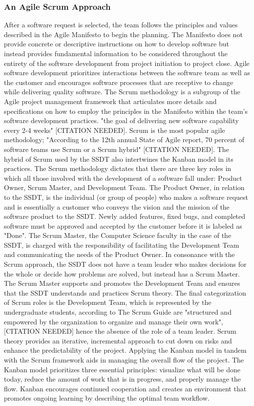 \subsubsection{An Agile Scrum Approach}
After a software request is selected, the team follows the principles and values described in the Agile Manifesto to begin the planning. The Manifesto does not provide concrete or descriptive instructions on how to develop software but instead provides fundamental information to be considered throughout the entirety of the software development from project initiation to project close. Agile software development prioritizes interactions between the software team as well as the customer and encourages software processes that are receptive to change while delivering quality software. The Scrum methodology is a subgroup of the Agile project management framework that articulates more details and specifications on how to employ the principles in the Manifesto within the team's software development practices.  "the goal of delivering new software capability every 2-4 weeks" [CITATION NEEDED]. Scrum is the most popular agile methodology; "According to the 12th annual State of Agile report, 70 percent of software teams use Scrum or a Scrum hybrid" [CITATION NEEDED]. The hybrid of Scrum used by the SSDT also intertwines the Kanban model in its practices. The Scrum methodology dictates that there are three key roles in which all those involved with the development of a software fall under: Product Owner, Scrum Master, and Development Team. The Product Owner, in relation to the SSDT, is the individual (or group of people) who makes a software request and is essentially a customer who conveys the vision and the mission of the software product to the SSDT. Newly added features, fixed bugs, and completed software must be approved and accepted by the customer before it is labeled as "Done". The Scrum Master, the Computer Science faculty in the case of the SSDT, is charged with the responsibility of facilitating the Development Team and communicating the needs of the Product Owner. In consonance with the Scrum approach, the SSDT does not have a team leader who makes decisions for the whole or decide how problems are solved, but instead has a Scrum Master. The Scrum Master supports and promotes the Development Team and ensures that the SSDT understands and practices Scrum theory. The final categorization of Scrum roles is the Development Team, which is represented by the undergraduate students, according to The Scrum Guide are "structured and empowered by the organization to organize and manage their own work", [CITATION NEEDED] hence the absence of the role of a team leader. Scrum theory provides an iterative, incremental approach to cut down on risks and enhance the predictability of the project. Applying the Kanban model in tandem with the Scrum framework aids in managing the overall flow of the project. The Kanban model prioritizes three essential principles: visualize what will be done today,  reduce the amount of work that is in progress, and properly manage the flow. Kanban encourages continued cooperation and creates an environment that promotes ongoing learning by describing the optimal team workflow.

